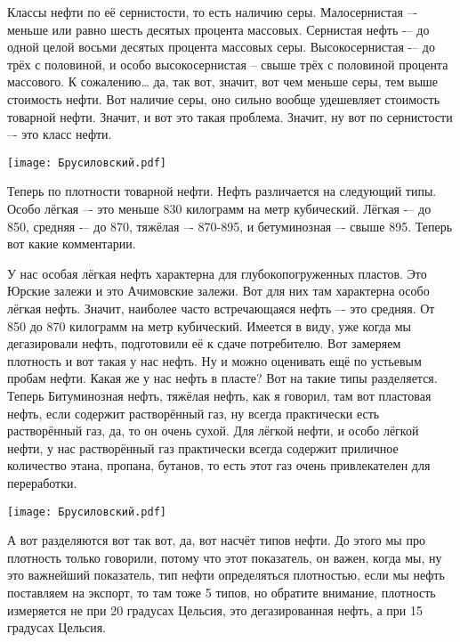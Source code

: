 \documentclass[main.tex]{subfiles}
\begin{document}
Классы нефти по её сернистости, то есть наличию серы.
Малосернистая –- меньше или равно шесть десятых процента массовых.
Сернистая нефть -– до одной целой восьми десятых процента массовых серы.
Высокосернистая -– до трёх с половиной, и особо высокосернистая – свыше трёх с половиной процента массового.
К сожалению… да, так вот, значит, вот чем меньше серы, тем выше стоимость нефти.
Вот наличие серы, оно сильно вообще удешевляет стоимость товарной нефти.
Значит, и вот это такая проблема.
Значит, ну вот по сернистости –- это класс нефти.

\begin{center}
\texttt{[image: Брусиловский.pdf]}
\end{center}

Теперь по плотности товарной нефти.
Нефть различается на следующий типы.
Особо лёгкая –- это меньше 830 килограмм на метр кубический.
Лёгкая -– до 850, средняя -– до 870, тяжёлая –- 870-895, и бетуминозная –- свыше 895.
Теперь вот какие комментарии.

У нас особая лёгкая нефть характерна для глубокопогруженных пластов.
Это Юрские залежи и это Ачимовские залежи.
Вот для них там характерна особо лёгкая нефть.
Значит, наиболее часто встречающаяся нефть –- это средняя.
От 850 до 870 килограмм на метр кубический.
Имеется в виду, уже когда мы дегазировали нефть, подготовили её к сдаче потребителю.
Вот замеряем плотность и вот такая у нас нефть.
Ну и можно оценивать ещё по устьевым пробам нефти.
Какая же у нас нефть в пласте?
Вот на такие типы разделяется.
Теперь Битуминозная нефть, тяжёлая нефть, как я говорил, там вот пластовая нефть, если содержит растворённый газ, ну всегда практически есть растворённый газ, да, то он очень сухой.
Для лёгкой нефти, и особо лёгкой нефти, у нас растворённый газ практически всегда содержит приличное количество этана, пропана, бутанов, то есть этот газ очень привлекателен для переработки.


\begin{center}
\texttt{[image: Брусиловский.pdf]}
\end{center}

А вот разделяются вот так вот, да, вот насчёт типов нефти.
До этого мы про плотность только говорили, потому что этот показатель, он важен, когда мы, ну это важнейший показатель, тип нефти определяться плотностью, если мы нефть поставляем на экспорт, то там тоже 5 типов, но обратите внимание, плотность измеряется не при 20 градусах Цельсия, это дегазированная нефть, а при 15 градусах Цельсия.
\end{document}

